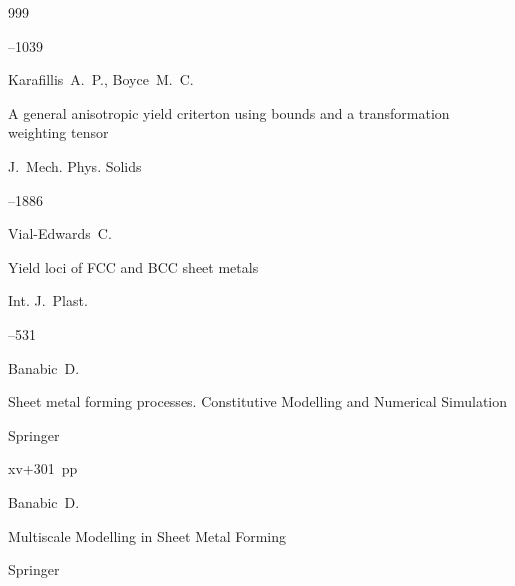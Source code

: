 \begin{thebibliography}{999}


--1039






\by Karafillis~A.~P., Boyce~M.~C. 

\paper A general anisotropic yield criterton using bounds and a transformation weighting tensor

\jour  J.~Mech. Phys. Solids 




--1886





\by Vial-Edwards~C.

\paper Yield loci of FCC and BCC sheet metals

\jour Int. J.~Plast.




--531






\by Banabic~D.

\book Sheet metal forming processes. Constitutive Modelling and Numerical Simulation


\publ Springer

\totalpages xv+301~pp \nofrills






\eds Banabic~D.

\book Multiscale Modelling in Sheet Metal Forming


\publ Springer


\end{thebibliography}

